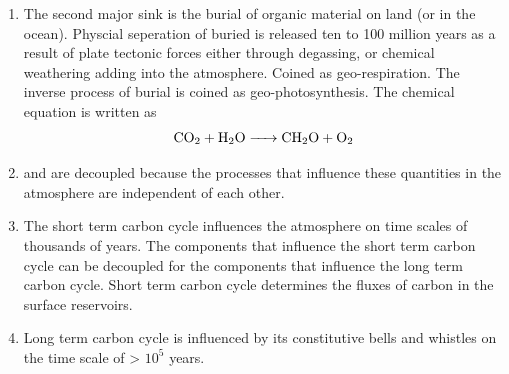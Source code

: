 \begin{enumerate}
\begin{enumerate}
\begin{enumerate}
          \item The second major  sink is the burial of organic material on land (or in the ocean). Physcial seperation of buried  is released ten to 100 million years as a result of plate tectonic forces either through degassing, or chemical weathering adding  into the atmosphere. Coined as geo-respiration. The inverse process of burial is coined as geo-photosynthesis. The chemical equation is written as
          \begin{equation}
            \ce{CO2 + H2O -> CH2O + O2}
          \end{equation}

          \item {} and  are decoupled because the processes that influence these quantities in the atmosphere are independent of each other.
          \item The short term carbon cycle influences the atmosphere on time scales of thousands of years. The components that influence the short term carbon cycle can be decoupled for the components that influence the long term carbon cycle. Short term carbon cycle determines the fluxes of carbon in the surface reservoirs.  
          \item Long term carbon cycle is influenced by its constitutive bells and whistles on the time scale of > $10^5$ years.   
        \end{enumerate}
    \end{enumerate}    
\end{enumerate}
